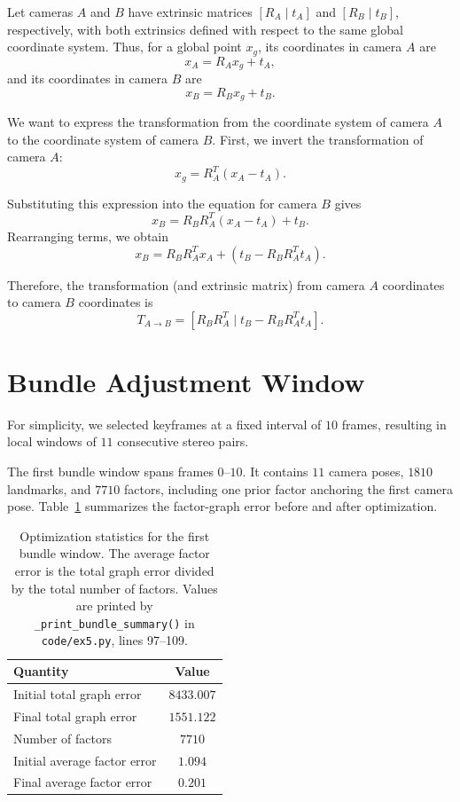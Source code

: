 \documentclass[12pt]{article}
\begin{document}
Let cameras $A$ and $B$ have extrinsic matrices $[R_A \mid t_A]$ and $[R_B \mid t_B]$, respectively, with both extrinsics defined with respect to the same global coordinate system. Thus, for a global point $x_g$, its coordinates in camera $A$ are
$$
x_A = R_A x_g + t_A,
$$
and its coordinates in camera $B$ are
$$
x_B = R_B x_g + t_B.
$$

We want to express the transformation from the coordinate system of camera $A$ to the coordinate system of camera $B$. First, we invert the transformation of camera $A$:
$$
x_g = R_A^T(x_A - t_A).
$$

Substituting this expression into the equation for camera $B$ gives
$$
x_B
=
R_B R_A^T(x_A - t_A) + t_B.
$$
Rearranging terms, we obtain
$$
x_B
=
R_B R_A^T x_A
+
\left(t_B - R_B R_A^T t_A\right).
$$

Therefore, the transformation (and extrinsic matrix) from camera $A$ coordinates to camera $B$ coordinates is
$$
T_{A \to B}
=
\left[
R_B R_A^T
\mid
t_B - R_B R_A^T t_A
\right].
$$

\section{Bundle Adjustment Window}

For simplicity, we selected keyframes at a fixed interval of $10$ frames, resulting in local windows of $11$ consecutive stereo pairs.

The first bundle window spans frames $0$--$10$. It contains $11$ camera poses, $1810$ landmarks, and $7710$ factors, including one prior factor anchoring the first camera pose. Table~\ref{tab:ba_first_window_stats} summarizes the factor-graph error before and after optimization.

\begin{table}[h]
    \centering
    \caption{Optimization statistics for the first bundle window. The average factor error is the total graph error divided by the total number of factors. Values are printed by \texttt{\_print\_bundle\_summary()} in \texttt{code/ex5.py}, lines 97--109.}
    \label{tab:ba_first_window_stats}
    \begin{tabular}{lc}
        \hline
        Quantity & Value \\
        \hline
        Initial total graph error & $8433.007$ \\
        Final total graph error & $1551.122$ \\
        Number of factors & $7710$ \\
        Initial average factor error & $1.094$ \\
        Final average factor error & $0.201$ \\
        \hline
    \end{tabular}
\end{table}
\end{document}
